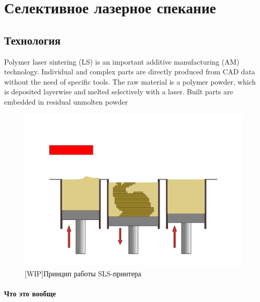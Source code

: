 \section{Селективное лазерное спекание}


\subsection{Технология}
Polymer laser sintering (LS) is an important additive manufacturing (AM) technology. Individual and complex parts are
directly produced from CAD data without the need of specific tools. The raw material is a polymer powder, which is deposited layerwise
and melted selectively with a laser. Built parts are embedded in residual unmolten powder



\begin{figure}[h]
    \centering
    \includegraphics[width=\linewidth]{fig/sls-2d.pdf}
    \caption{[WIP]Принцип работы SLS-принтера}
    \label{fig:printer}
\end{figure}


\paragraph{Что это вообще}
